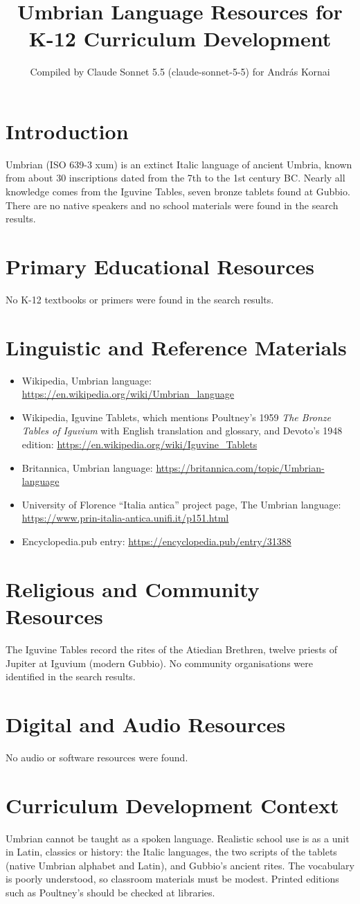 \documentclass[12pt]{article}
\title{Umbrian Language Resources for K-12 Curriculum Development}
\author{Compiled by Claude Sonnet 5.5 (claude-sonnet-5-5) for Andr\'as Kornai}
\date{}
\begin{document}
\maketitle
\section{Introduction}
Umbrian (ISO 639-3 xum) is an extinct Italic language of ancient Umbria, known from about 30 inscriptions dated from the 7th to the 1st century BC. Nearly all knowledge comes from the Iguvine Tables, seven bronze tablets found at Gubbio. There are no native speakers and no school materials were found in the search results.
\section{Primary Educational Resources}
No K-12 textbooks or primers were found in the search results.
\section{Linguistic and Reference Materials}
\begin{itemize}
\item Wikipedia, Umbrian language: \url{https://en.wikipedia.org/wiki/Umbrian_language}
\item Wikipedia, Iguvine Tablets, which mentions Poultney's 1959 \emph{The Bronze Tables of Iguvium} with English translation and glossary, and Devoto's 1948 edition: \url{https://en.wikipedia.org/wiki/Iguvine_Tablets}
\item Britannica, Umbrian language: \url{https://britannica.com/topic/Umbrian-language}
\item University of Florence ``Italia antica'' project page, The Umbrian language: \url{https://www.prin-italia-antica.unifi.it/p151.html}
\item Encyclopedia.pub entry: \url{https://encyclopedia.pub/entry/31388}
\end{itemize}
\section{Religious and Community Resources}
The Iguvine Tables record the rites of the Atiedian Brethren, twelve priests of Jupiter at Iguvium (modern Gubbio). No community organisations were identified in the search results.
\section{Digital and Audio Resources}
No audio or software resources were found.
\section{Curriculum Development Context}
Umbrian cannot be taught as a spoken language. Realistic school use is as a unit in Latin, classics or history: the Italic languages, the two scripts of the tablets (native Umbrian alphabet and Latin), and Gubbio's ancient rites. The vocabulary is poorly understood, so classroom materials must be modest. Printed editions such as Poultney's should be checked at libraries.
\end{document}
